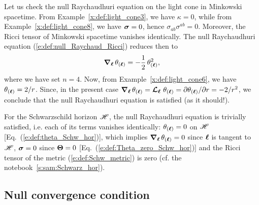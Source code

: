\begin{example}
Let us check the null Raychaudhuri equation on the light cone in Minkowski
spacetime. From Example~\ref{x:def:light_cone3}, we have $\kappa=0$, while
from Example~\ref{x:def:light_cone8}, we have $\bm{\sigma}=0$,
hence $\sigma_{ab} \sigma^{ab}=0$. Moreover, the Ricci tensor of Minkowski
spacetime vanishes identically. The null Raychaudhuri equation
(\ref{e:def:null_Raychaud_Ricci})
reduces then to
\[
    \bm{\nabla}_{\bm{\ell}}\,  \theta_{(\bm{\ell})} =  - \frac{1}{2} \, \theta_{(\bm{\ell})}^2 ,
\]
where we have set $n=4$. Now, from Example~\ref{x:def:light_cone6}, we
have $\theta_{(\bm{\ell})} = 2/r$. Since, in the present case
$\bm{\nabla}_{\bm{\ell}}\,  \theta_{(\bm{\ell})}  = \bm{\mathcal{L}}_{\bm{\ell}}\, \,  \theta_{(\bm{\ell})}  = {\partial \theta_{(\bm{\ell})}}/{\partial r} =
- 2/r^2$, we conclude that the null Raychaudhuri equation is satisfied (as
it should!).
\end{example}

\begin{example} \label{x:def:Schw_hor9}
For the Schwarzschild horizon $\mathscr{H}$, the null Raychaudhuri equation is
trivially satisfied, i.e. each of its terms vanishes identically:
$\theta_{(\bm{\ell})}=0$ on $\mathscr{H}$ [Eq.~(\ref{e:def:theta_Schw_hor})],
which implies $\bm{\nabla}_{\bm{\ell}}\,  \theta_{(\bm{\ell})}=0$ since $\bm{\ell}$ is tangent to $\mathscr{H}$,
$\bm{\sigma}=0$ since $\bm{\Theta}=0$ [Eq.~(\ref{e:def:Theta_zero_Schw_hor})]
and the Ricci tensor of the metric (\ref{e:def:Schw_metric}) is zero
(cf. the notebook~\ref{s:sam:Schwarz_hor}).
\end{example}


\subsection{Null convergence condition} \label{s:def:null_convergence_cond}

